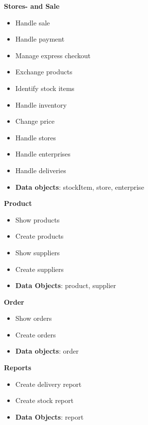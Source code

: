 \begin{multicols}{2}
	\textbf{Stores- and Sale}
	\begin{flushleft}
		\begin{itemize}[noitemsep]
			\item Handle sale
			\item Handle payment
			\item Manage express checkout
			\item Exchange products
			\item Identify stock items
			\item Handle inventory
			\item Change price
			\item Handle stores
			\item Handle enterprises
			\item Handle deliveries
			\item \textbf{Data objects}: stockItem, store, enterprise
		\end{itemize}
	\end{flushleft}
	
	
	\vfill
	\columnbreak
	\textbf{Product}
	\begin{flushleft}
		\begin{itemize}[noitemsep]
			\item Show products
			\item Create products
			\item Show suppliers
			\item Create suppliers
			\item \textbf{Data Objects}: product, supplier
		
		
		\end{itemize}
	\end{flushleft}

\end{multicols}




\begin{multicols}{2}
	\textbf{Order}
	\begin{flushleft}
		\begin{itemize}[noitemsep]
			\item Show orders
			\item Create orders
			\item \textbf{Data objects}: order
		\end{itemize}
	\end{flushleft}
	
	
    	\vfill
	\columnbreak
	\textbf{Reports}
	\begin{flushleft}
		\begin{itemize}[noitemsep]
			\item Create delivery report
			\item Create stock report
			\item \textbf{Data Objects}: report  
	
		\end{itemize}
	\end{flushleft}
\end{multicols}






